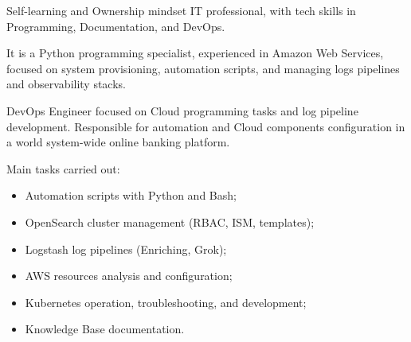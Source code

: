 \documentclass[10pt,a4paper]{altacv}
\begin{document}



\begin{fullwidth}
    \makecvheader
\end{fullwidth}



Self-learning and Ownership mindset IT professional, with tech skills in Programming, Documentation, and DevOps.

\bigskip

It is a Python programming specialist, experienced in Amazon Web Services, focused on system provisioning, automation scripts, and managing logs pipelines and observability stacks.



DevOps Engineer focused on Cloud programming tasks and log pipeline development. Responsible for automation and Cloud components configuration in a world system-wide online banking platform.

\bigskip

Main tasks carried out:

\bigskip

\begin{itemize}
    \item Automation scripts with Python and Bash;
    \item OpenSearch cluster management (RBAC, ISM, templates);
    \item Logstash log pipelines (Enriching, Grok);
    \item AWS resources analysis and configuration;
    \item Kubernetes operation, troubleshooting, and development;
    \item Knowledge Base documentation.
\end{itemize}    
\end{document}
